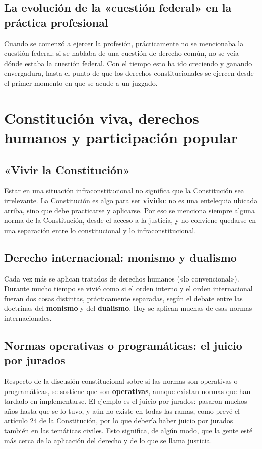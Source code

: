 \documentclass[12pt,oneside]{book}
\begin{document}
\subsection{La evolución de la «cuestión federal» en la práctica profesional}

Cuando se comenzó a ejercer la profesión, prácticamente no se mencionaba la cuestión federal: si se hablaba de una cuestión de derecho común, no se veía dónde estaba la cuestión federal. Con el tiempo esto ha ido creciendo y ganando envergadura, hasta el punto de que los derechos constitucionales se ejercen desde el primer momento en que se acude a un juzgado.

\section{Constitución viva, derechos humanos y participación popular}

\subsection{«Vivir la Constitución»}

Estar en una situación infraconstitucional no significa que la Constitución sea irrelevante. La Constitución es algo para ser \textbf{vivido}: no es una entelequia ubicada arriba, sino que debe practicarse y aplicarse. Por eso se menciona siempre alguna norma de la Constitución, desde el acceso a la justicia, y no conviene quedarse en una separación entre lo constitucional y lo infraconstitucional.

\subsection{Derecho internacional: monismo y dualismo}

Cada vez más se aplican tratados de derechos humanos («lo convencional»). Durante mucho tiempo se vivió como si el orden interno y el orden internacional fueran dos cosas distintas, prácticamente separadas, según el debate entre las doctrinas del \textbf{monismo} y del \textbf{dualismo}. Hoy se aplican muchas de esas normas internacionales.

\subsection{Normas operativas o programáticas: el juicio por jurados}

Respecto de la discusión constitucional sobre si las normas son operativas o programáticas, se sostiene que son \textbf{operativas}, aunque existan normas que han tardado en implementarse. El ejemplo es el juicio por jurados: pasaron muchos años hasta que se lo tuvo, y aún no existe en todas las ramas, como prevé el artículo 24 de la Constitución, por lo que debería haber juicio por jurados también en las temáticas civiles. Esto significa, de algún modo, que la gente esté más cerca de la aplicación del derecho y de lo que se llama justicia.
\end{document}
